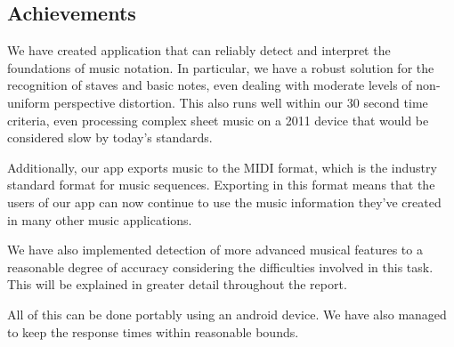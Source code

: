 \subsection{Achievements}
We have created application that can reliably detect and interpret the foundations of music notation. In  particular, we have a robust solution for the recognition of staves and basic notes, even dealing with moderate levels of non-uniform perspective distortion. This also runs well within our 30 second time criteria, even processing complex sheet music on a 2011 device that would be considered slow by today's standards.

Additionally, our app exports music to the MIDI format, which is the industry standard format for music sequences. Exporting in this format means that the users of our app can now continue to use the music information they've created in many other music applications.

We have also implemented detection of more advanced musical features to a reasonable degree of accuracy considering the difficulties involved in this task. This will be explained in greater detail throughout the report.

All of this can be done portably using an android device. We have also managed to keep the response times within reasonable bounds.
